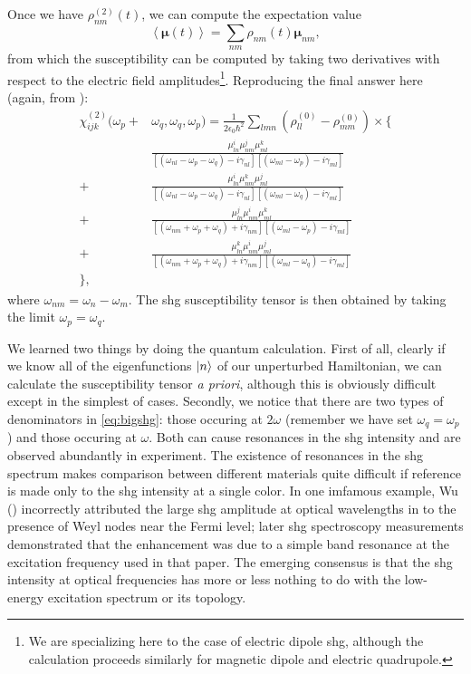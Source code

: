 Once we have $\rho_{nm}^{(2)}(t)$, we can compute the expectation value
\begin{equation}
\left<\bm{\mu}(t)\right>=\sum_{nm}\rho_{nm}(t)\bm{\mu}_{nm},
\end{equation}
from which the susceptibility can be computed by taking two derivatives with respect to the electric field amplitudes\footnote{We are specializing here to the case of electric dipole \gls{shg}, although the calculation proceeds similarly for magnetic dipole and electric quadrupole.}.
Reproducing the final answer here (again, from ):
\begin{equation}\label{eq:bigshg}
\begin{aligned}
\chi_{ijk}^{(2)}(\omega_p+&\omega_q, \omega_q, \omega_p) = \frac{1}{2\epsilon_0\hbar^2}\sum_{lmn}(\rho_{ll}^{(0)}-\rho_{mm}^{(0)})\times\Big\{\\
&\frac{\mu^i_{ln}\mu^j_{nm}\mu^k_{ml}}{[(\omega_{nl}-\omega_p-\omega_q)-i\gamma_{nl}][(\omega_{ml}-\omega_p)-i\gamma_{ml}]}\\
+&\frac{\mu^i_{ln}\mu^k_{nm}\mu^j_{ml}}{[(\omega_{nl}-\omega_p-\omega_q)-i\gamma_{nl}][(\omega_{ml}-\omega_q)-i\gamma_{ml}]}\\
+&\frac{\mu^j_{ln}\mu^i_{nm}\mu^k_{ml}}{[(\omega_{nm}+\omega_p+\omega_q)+i\gamma_{nm}][(\omega_{ml}-\omega_p)-i\gamma_{ml}]}\\
+&\frac{\mu^k_{ln}\mu^i_{nm}\mu^j_{ml}}{[(\omega_{nm}+\omega_p+\omega_q)+i\gamma_{nm}][(\omega_{ml}-\omega_q)-i\gamma_{ml}]}\\
\Big\},
\end{aligned}
\end{equation}
where $\omega_{nm}=\omega_n-\omega_m$.
The \gls{shg} susceptibility tensor is then obtained by taking the limit $\omega_p=\omega_q$.

We learned two things by doing the quantum calculation.
First of all, clearly if we know all of the eigenfunctions $\ket{n}$ of our unperturbed Hamiltonian, we can calculate the susceptibility tensor \textit{a priori}, although this is obviously difficult except in the simplest of cases.
Secondly, we notice that there are two types of denominators in \cref{eq:bigshg}: those occuring at $2\omega$ (remember we have set $\omega_q=\omega_p$) and those occuring at $\omega$.
Both can cause resonances in the \gls{shg} intensity and are observed abundantly in experiment\cite{fiebig_second_2001}.
The existence of resonances in the \gls{shg} spectrum makes comparison between different materials quite difficult if reference is made only to the \gls{shg} intensity at a single color.
In one imfamous example, Wu \etal () incorrectly attributed the large \gls{shg} amplitude at optical wavelengths in  to the presence of Weyl nodes near the Fermi level; later \gls{shg} spectroscopy measurements demonstrated that the enhancement was due to a simple band resonance at the excitation frequency used in that paper\cite{patankar_resonance-enhanced_2018}.
The emerging consensus is that the \gls{shg} intensity at optical frequencies has more or less nothing to do with the low-energy excitation spectrum or its topology.
